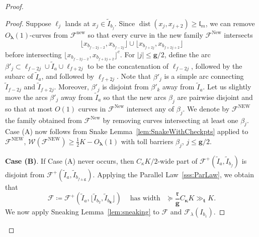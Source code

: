 \documentclass{amsart}
\renewcommand{\sp}{{\ \ }}
\newcommand{\1}{{\mathbb 1 }}
\newcommand{\blambda}{{\boldsymbol\lambda}}
\newcommand{\bkappa}{{\boldsymbol\kappa}}
\newcommand{\Fam}{{\mathcal F}}
\newcommand{\Width}{{\mathcal W}}
\newcommand{\bbk}{{\mathbf k}}
\newcommand{\bbt}{{\mathbf t}}
\newcommand{\bbg}{{\mathbf g}}
\newcommand{\rr}{\mathfrak{r}}
\newcommand{\length}{{\mathfrak l}}
\newcommand\new{{\operatorname{new}}}
\newcommand\New{{\operatorname{New}}}
\newcommand\NEW{{\operatorname{NEW}}}
\theoremstyle{remark}
\numberwithin{equation}{section}
\theoremstyle{definition}
\newcommand{\dist}{\operatorname{dist}}
\begin{document}
\begin{proof}
\begin{proof}
Suppose $\ell_j$ lands at $x_j\in \widetilde I_{b_j}$. Since $\dist(x_j,x_{j+2})\ge \length_m$, we can remove $O_\blambda(1)$-curves from $\Fam^\new$ so that every curve in the new family $\Fam^\New$ intersects 
\[\lfloor x_{b_{f-2j -2}},x_{b_{f-2j }}\rfloor \cup \lfloor x_{b_{f+2j}},x_{b_{f+2j+2 }}\rfloor \]  before intersecting $\lfloor x_{b_{f-2j -2}},x_{b_{f+2j+2 }}\rfloor^c$. For $|j|\le \bbg/2$, define the arc $\beta'_j\subset  \ell_{f-2j}\cup \widetilde I_a \cup \ell_{f+2j}$ to be the concatenation of $\ell_{f-2j}$, followed by the subarc of $ \widetilde I_a $, and followed by $ \ell_{f+2j}$. Note that $\beta'_j$ is a simple arc connecting $\widetilde I_{f-2j}$ and $\widetilde I_{f+2j}$. Moreover, $\beta'_j$ is disjoint from $\beta'_k$ away from $\widetilde I_a$. Let us slightly move the arcs $\beta'_j$ away from $\widetilde I_a$ so that the new arcs $\beta_j$ are pairwise disjoint and so that at most $O(1)$ curves in $\Fam^\New$ intersect any of $\beta_j$. We denote by $\Fam^\NEW$ the family obtained from $\Fam^\New$ by removing curves intersecting at least one $\beta_j$. Case (A) now follows from Snake Lemma~\ref{lem:SnakeWithCheckpts} applied to $\Fam^\NEW$, $\Width(\Fam^\NEW)\ge \frac 1 2 K -O_\blambda(1)$ with toll barriers $\beta_j$, $j\le \bbg/2$.





 {\bf Case (B)}. If {Case (A)} never occurs, then $C_\kappa K /2$-wide part of $\Fam^+(\widetilde I_a, \widetilde I_{b_f})$ is disjoint from $\Fam^+(\widetilde I_a, \widetilde I_{b_{f\pm \bbg}})$. Applying the Parallel Law~\ref{sss:ParLaw}, we obtain that \[\Fam\coloneqq \Fam^{+}\left(\widetilde I_{a}, \lfloor  \widetilde I_{b_2} ,\widetilde I_{b_\bbk} \rfloor\right)\sp\sp\text{ has width }\sp \succeq\frac{\rr}{\bbg} C_\bkappa K\gg_\bbt K .\]
 We now apply Sneaking Lemma~\ref{lem:sneaking} to $\Fam$ and $\Fam_\lambda (I_{b_1})$.
\end{proof}






\end{proof}
\end{document}
